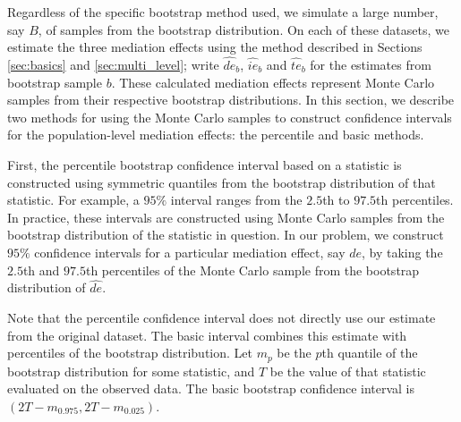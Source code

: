 \documentclass{article}
\begin{document}
Regardless of the specific bootstrap method used, we simulate a large number, say $B$, of samples from the bootstrap distribution. On each of these datasets, we estimate the three mediation effects using the method described in Sections \ref{sec:basics} and \ref{sec:multi_level}; write $\hat{de}_b$, $\hat{ie}_b$ and $\hat{te}_b$ for the estimates from bootstrap sample $b$. These calculated mediation effects represent Monte Carlo samples from their respective bootstrap distributions. In this section, we describe two methods for using the Monte Carlo samples to construct confidence intervals for the population-level mediation effects: the percentile and basic methods.

First, the percentile bootstrap confidence interval based on a statistic is constructed using symmetric quantiles from the bootstrap distribution of that statistic. For example, a $95\%$ interval ranges from the $2.5$th to $97.5$th percentiles. In practice, these intervals are constructed using Monte Carlo samples from the bootstrap distribution of the statistic in question. In our problem, we construct $95\%$ confidence intervals for a particular mediation effect, say $de$, by taking the $2.5$th and $97.5$th percentiles of the Monte Carlo sample from the bootstrap distribution of $\hat{de}$.

Note that the percentile confidence interval does not directly use our estimate from the original dataset. The basic interval combines this estimate with percentiles of the bootstrap distribution. Let $m_p$ be the $p$th quantile of the bootstrap distribution for some statistic, and $T$ be the value of that statistic evaluated on the observed data. The basic bootstrap confidence interval is $(2T - m_{0.975}, 2T - m_{0.025})$. 


\end{document}
